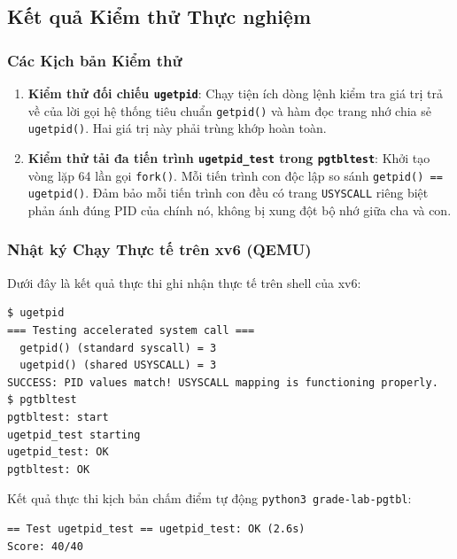 \subsection{Kết quả Kiểm thử Thực nghiệm}

\subsubsection{Các Kịch bản Kiểm thử}
\begin{enumerate}
    \item \textbf{Kiểm thử đối chiếu \texttt{ugetpid}}: Chạy tiện ích dòng lệnh kiểm tra giá trị trả về của lời gọi hệ thống tiêu chuẩn \texttt{getpid()} và hàm đọc trang nhớ chia sẻ \texttt{ugetpid()}. Hai giá trị này phải trùng khớp hoàn toàn.
    \item \textbf{Kiểm thử tải đa tiến trình \texttt{ugetpid\_test} trong \texttt{pgtbltest}}: Khởi tạo vòng lặp 64 lần gọi \texttt{fork()}. Mỗi tiến trình con độc lập so sánh \texttt{getpid() == ugetpid()}. Đảm bảo mỗi tiến trình con đều có trang \texttt{USYSCALL} riêng biệt phản ánh đúng PID của chính nó, không bị xung đột bộ nhớ giữa cha và con.
\end{enumerate}

\subsubsection{Nhật ký Chạy Thực tế trên xv6 (QEMU)}
Dưới đây là kết quả thực thi ghi nhận thực tế trên shell của xv6:

\begin{center}
\begin{minipage}{0.92\textwidth}
\begin{lstlisting}[numbers=none,xleftmargin=0pt,framexleftmargin=0pt]
$ ugetpid
=== Testing accelerated system call ===
  getpid() (standard syscall) = 3
  ugetpid() (shared USYSCALL) = 3
SUCCESS: PID values match! USYSCALL mapping is functioning properly.
$ pgtbltest
pgtbltest: start
ugetpid_test starting
ugetpid_test: OK
pgtbltest: OK
\end{lstlisting}
\end{minipage}
\end{center}

\noindent Kết quả thực thi kịch bản chấm điểm tự động \texttt{python3 grade-lab-pgtbl}:

\begin{center}
\begin{minipage}{0.92\textwidth}
\begin{lstlisting}[numbers=none,xleftmargin=0pt,framexleftmargin=0pt]
== Test ugetpid_test == ugetpid_test: OK (2.6s) 
Score: 40/40
\end{lstlisting}
\end{minipage}
\end{center}

